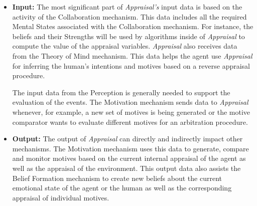 \documentclass[letterpaper]{article}
\begin{document}
\begin{itemize}
  \item \textbf{Input:} The most significant part of \textit{Appraisal's} input
  data is based on the activity of the Collaboration mechanism. This data
  includes all the required Mental States associated with the Collaboration
  mechanism. For instance, the beliefs and their Strengths will be used by
  algorithms inside of \textit{Appraisal} to compute the value of the appraisal
  variables. \textit{Appraisal} also receives data from the Theory of Mind
  mechanism. This data helps the agent use \textit{Appraisal} for inferring
  the human's intentions and motives based on a reverse appraisal procedure.
  
  The input data from the Perception is generally needed to support the
  evaluation of the events. The Motivation mechanism sends data to
  \textit{Appraisal} whenever, for example, a new set of motives is being
  generated or the motive comparator wants to evaluate different motives for an
  arbitration procedure.
   
  \item \textbf{Output:} The output of \textit{Appraisal} can directly and
  indirectly impact other mechanisms. The Motivation mechanism uses this data to
  generate, compare and monitor motives based on the current internal appraisal
  of the agent as well as the appraisal of the environment. This output data
  also assists the Belief Formation mechanism to create new beliefs about the
  current emotional state of the agent or the human as well as the corresponding
  appraisal of individual motives.
  

\end{itemize}
\end{document}
